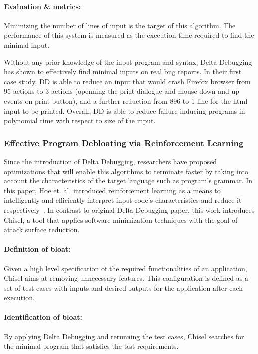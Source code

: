\paragraph{Evaluation \& metrics:} Minimizing the number of lines of input is the target of this algorithm. The performance of this system is measured as the execution time required to find the minimal input.

Without any prior knowledge of the input program and syntax, Delta Debugging has shown to effectively find minimal inputs on real bug reports. In their first case study, DD is able to reduce an input that would crash Firefox browser from 95 actions to 3 actions (openning the print dialogue and mouse down and up events on print button), and a further reduction from 896 to 1 line for the html input to be printed. Overall, DD is able to reduce failure inducing programs in polynomial time with respect to size of the input.

\subsubsection{Effective Program Debloating via Reinforcement Learning}
Since the introduction of Delta Debugging, researchers have proposed optimizations that will enable this algorithms to terminate faster by taking into account the characteristics of the target language such as program's grammar. In this paper, Hoe et. al. introduced reinforcement learning as a means to intelligently and efficiently interpret input code's characteristics and reduce it respectively~\cite{heo2018effective}. In contrast to original Delta Debugging paper, this work introduces Chisel, a tool that applies software minimization techniques with the goal of attack surface reduction.

\paragraph{Definition of bloat:} Given a high level specification of the required functionalities of an application, Chisel aims at removing unnecessary features. This configuration is defined as a set of test cases with inputs and desired outputs for the application after each execution.
\paragraph{Identification of bloat:} By applying Delta Debugging and rerunning the test cases, Chisel searches for the minimal program that satisfies the test requirements.

